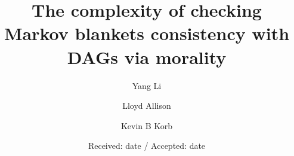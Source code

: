 \newcommand{\COMMENT}[2][.5\linewidth]{\leavevmode\hfill\makebox[#1][l]{//~#2}}
  
\makeatletter
\newcommand*{\centernot}{%
  \mathpalette\@centernot
}
\def\@centernot#1#2{%
  \mathrel{%
    \rlap{%
      \settowidth\dimen@{$\m@th#1{#2}$}%
      \kern.5\dimen@
      \settowidth\dimen@{$\m@th#1=$}%
      \kern-.5\dimen@
      $\m@th#1\not$%
    }%
    {#2}%
  }%
}
\makeatother

%
%



\title{The complexity of checking Markov blankets consistency with DAGs via morality
}


\author{Yang Li         \and
        Lloyd Allison \and
        Kevin B Korb
}



\date{Received: date / Accepted: date}

\maketitle

